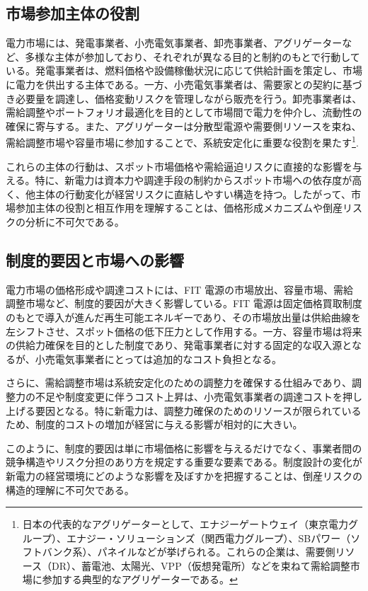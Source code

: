 \subsection{市場参加主体の役割}

電力市場には、発電事業者、小売電気事業者、卸売事業者、アグリゲーターなど、多様な主体が参加しており、それぞれが異なる目的と制約のもとで行動している。発電事業者は、燃料価格や設備稼働状況に応じて供給計画を策定し、市場に電力を供出する主体である。一方、小売電気事業者は、需要家との契約に基づき必要量を調達し、価格変動リスクを管理しながら販売を行う。卸売事業者は、需給調整やポートフォリオ最適化を目的として市場間で電力を仲介し、流動性の確保に寄与する。また、アグリゲーターは分散型電源や需要側リソースを束ね、需給調整市場や容量市場に参加することで、系統安定化に重要な役割を果たす\footnote{日本の代表的なアグリゲーターとして、エナジーゲートウェイ（東京電力グループ）、エナジー・ソリューションズ（関西電力グループ）、SBパワー（ソフトバンク系）、パネイルなどが挙げられる。これらの企業は、需要側リソース（DR）、蓄電池、太陽光、VPP（仮想発電所）などを束ねて需給調整市場に参加する典型的なアグリゲーターである。}.

これらの主体の行動は、スポット市場価格や需給逼迫リスクに直接的な影響を与える。特に、新電力は資本力や調達手段の制約からスポット市場への依存度が高く、他主体の行動変化が経営リスクに直結しやすい構造を持つ。したがって、市場参加主体の役割と相互作用を理解することは、価格形成メカニズムや倒産リスクの分析に不可欠である。

\subsection{制度的要因と市場への影響}

電力市場の価格形成や調達コストには、FIT 電源の市場放出、容量市場、需給調整市場など、制度的要因が大きく影響している。FIT 電源は固定価格買取制度のもとで導入が進んだ再生可能エネルギーであり、その市場放出量は供給曲線を左シフトさせ、スポット価格の低下圧力として作用する。一方、容量市場は将来の供給力確保を目的とした制度であり、発電事業者に対する固定的な収入源となるが、小売電気事業者にとっては追加的なコスト負担となる。

さらに、需給調整市場は系統安定化のための調整力を確保する仕組みであり、調整力の不足や制度変更に伴うコスト上昇は、小売電気事業者の調達コストを押し上げる要因となる。特に新電力は、調整力確保のためのリソースが限られているため、制度的コストの増加が経営に与える影響が相対的に大きい。

このように、制度的要因は単に市場価格に影響を与えるだけでなく、事業者間の競争構造やリスク分担のあり方を規定する重要な要素である。制度設計の変化が新電力の経営環境にどのような影響を及ぼすかを把握することは、倒産リスクの構造的理解に不可欠である。


